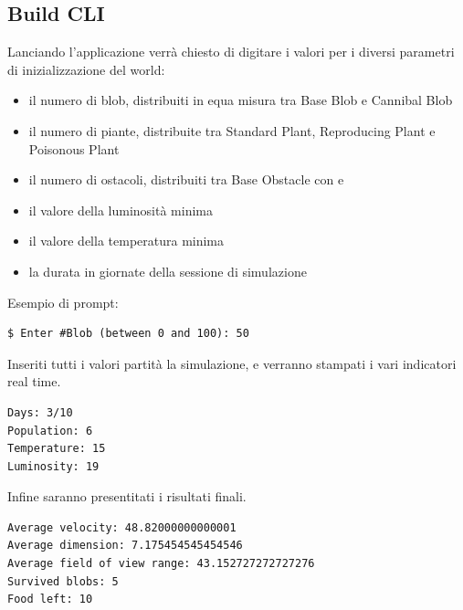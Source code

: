 \subsection{Build CLI}
Lanciando l'applicazione verrà chiesto di digitare i valori per i diversi parametri di inizializzazione del world:
\begin{itemize}
\item il numero di blob, distribuiti in equa misura tra Base Blob e Cannibal Blob
\item il numero di piante, distribuite tra Standard Plant, Reproducing Plant e Poisonous Plant
\item il numero di ostacoli, distribuiti tra Base Obstacle con  e 
\item il valore della luminosità minima
\item il valore della temperatura minima
\item la durata in giornate della sessione di simulazione
\end{itemize}

Esempio di prompt:

\begin{verbatim}
$ Enter #Blob (between 0 and 100): 50
\end{verbatim}

Inseriti tutti i valori partità la simulazione, e verranno stampati i vari indicatori real time.

\begin{verbatim}
Days: 3/10
Population: 6
Temperature: 15
Luminosity: 19
\end{verbatim}

Infine saranno presentitati i risultati finali.

\begin{verbatim}
Average velocity: 48.82000000000001
Average dimension: 7.175454545454546
Average field of view range: 43.152727272727276
Survived blobs: 5
Food left: 10
\end{verbatim}

